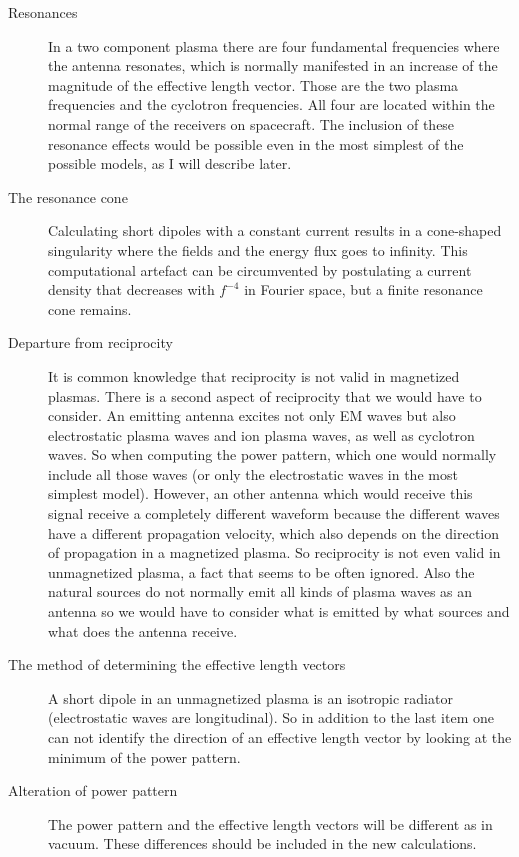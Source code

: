 \documentclass[a4paper,10pt]{article}
\begin{document}
\begin{description}
    \item[Resonances] In a two component plasma there are four fundamental frequencies where the antenna resonates, which is normally manifested in an increase of the magnitude of the effective length vector. Those are the two plasma frequencies and the cyclotron frequencies. All four are located within the normal range of the receivers on spacecraft. The inclusion of these resonance effects would be possible even in the most simplest of the possible models, as I will describe later.

\item[The resonance cone]
Calculating short dipoles with a constant current results in a cone-shaped singularity where the fields and the energy flux goes to infinity. This computational artefact can be circumvented by postulating a current density that decreases with $f^{-4}$ in Fourier space, but a finite resonance cone remains.

\item[Departure from reciprocity] It is common knowledge that reciprocity is not valid in magnetized plasmas. There is a second aspect of reciprocity that we would have to consider. An emitting antenna excites not only EM waves but also electrostatic plasma waves and ion plasma waves, as well as cyclotron waves. So when computing the power pattern, which one would normally include all those waves (or only the electrostatic waves in the most simplest model). However, an other antenna which would receive this signal receive a completely different waveform because the different waves have a different propagation velocity, which also depends on the direction of propagation in a magnetized plasma. So reciprocity is not even valid in unmagnetized plasma, a fact that seems to be often ignored. Also the natural sources do not normally emit all kinds of plasma waves as an antenna so we would have to consider what is emitted by what sources and what does the antenna receive.

\item[The method of determining the effective length vectors]
A short dipole in an unmagnetized plasma is an isotropic radiator (electrostatic waves are longitudinal). So in addition to the last item one can not identify the direction of an effective length vector by looking at the minimum of the power pattern.

\item[Alteration of power pattern]
The power pattern and the effective length vectors will be different as in vacuum. These differences should be included in the new calculations.


\end{description}
\end{document}
